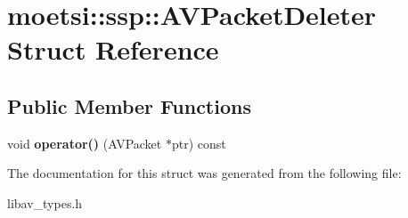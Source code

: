 \hypertarget{structmoetsi_1_1ssp_1_1AVPacketDeleter}{}\section{moetsi\+:\+:ssp\+:\+:A\+V\+Packet\+Deleter Struct Reference}
\label{structmoetsi_1_1ssp_1_1AVPacketDeleter}
\subsection*{Public Member Functions}
\begin{DoxyCompactItemize}
\item 
\mbox{\label{structmoetsi_1_1ssp_1_1AVPacketDeleter_adcf3b134c523ffd499c1b99b522e9d57}} 
void {\bfseries operator()} (A\+V\+Packet $\ast$ptr) const
\end{DoxyCompactItemize}


The documentation for this struct was generated from the following file\+:\begin{DoxyCompactItemize}
\item 
libav\+\_\+types.\+h\end{DoxyCompactItemize}
